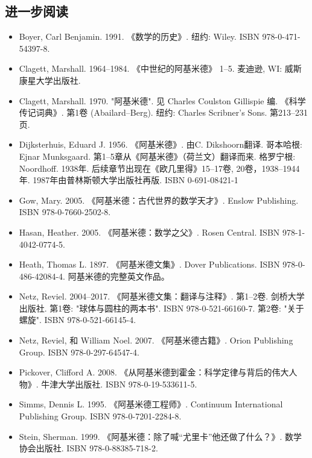 \subsection{进一步阅读}
\begin{itemize}
\item Boyer, Carl Benjamin. 1991. 《数学的历史》. 纽约: Wiley. ISBN 978-0-471-54397-8.
\item Clagett, Marshall. 1964–1984. 《中世纪的阿基米德》 1–5. 麦迪逊, WI: 威斯康星大学出版社.
\item Clagett, Marshall. 1970. "阿基米德". 见 Charles Coulston Gillispie 编. 《科学传记词典》. 第1卷 (Abailard–Berg). 纽约: Charles Scribner's Sons. 第213–231页.
\item Dijksterhuis, Eduard J. 1956. 《阿基米德》. 由C. Dikshoorn翻译. 哥本哈根: Ejnar Munksgaard. 第1–5章从《阿基米德》（荷兰文）翻译而来. 格罗宁根: Noordhoff. 1938年. 后续章节出现在《欧几里得》15–17卷, 20卷，1938–1944年. 1987年由普林斯顿大学出版社再版. ISBN 0-691-08421-1
\item Gow, Mary. 2005. 《阿基米德：古代世界的数学天才》. Enslow Publishing. ISBN 978-0-7660-2502-8.
\item Hasan, Heather. 2005. 《阿基米德：数学之父》. Rosen Central. ISBN 978-1-4042-0774-5.
\item Heath, Thomas L. 1897. 《阿基米德文集》. Dover Publications. ISBN 978-0-486-42084-4. 阿基米德的完整英文作品。
\item Netz, Reviel. 2004–2017. 《阿基米德文集：翻译与注释》. 第1–2卷. 剑桥大学出版社. 第1卷: "球体与圆柱的两本书". ISBN 978-0-521-66160-7. 第2卷: "关于螺旋". ISBN 978-0-521-66145-4.
\item Netz, Reviel, 和 William Noel. 2007. 《阿基米德古籍》. Orion Publishing Group. ISBN 978-0-297-64547-4.
\item Pickover, Clifford A. 2008. 《从阿基米德到霍金：科学定律与背后的伟大人物》. 牛津大学出版社. ISBN 978-0-19-533611-5.
\item Simms, Dennis L. 1995. 《阿基米德工程师》. Continuum International Publishing Group. ISBN 978-0-7201-2284-8.
\item Stein, Sherman. 1999. 《阿基米德：除了喊“尤里卡”他还做了什么？》. 数学协会出版社. ISBN 978-0-88385-718-2.
\end{itemize}
